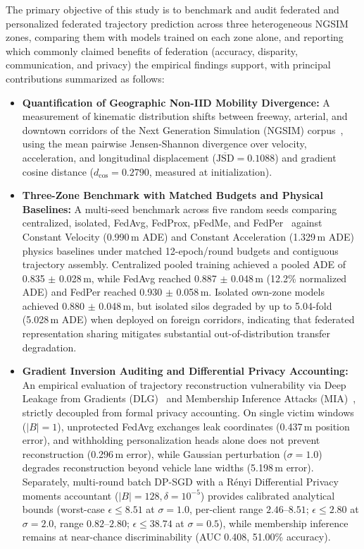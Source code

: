 \documentclass[journal]{IEEEtran}
\begin{document}
The primary objective of this study is to benchmark and audit federated and personalized federated trajectory prediction across three heterogeneous NGSIM zones, comparing them with models trained on each zone alone, and reporting which commonly claimed benefits of federation (accuracy, disparity, communication, and privacy) the empirical findings support, with principal contributions summarized as follows:
\begin{itemize}
    \item \textbf{Quantification of Geographic Non-IID Mobility Divergence:} A measurement of kinematic distribution shifts between freeway, arterial, and downtown corridors of the Next Generation Simulation (NGSIM) corpus~\cite{fhwa2006ngsim}, using the mean pairwise Jensen-Shannon divergence over velocity, acceleration, and longitudinal displacement ($\overline{\mathrm{JSD}} = 0.1088$) and gradient cosine distance ($d_{\cos} = 0.2790$, measured at initialization).
    \item \textbf{Three-Zone Benchmark with Matched Budgets and Physical Baselines:} A multi-seed benchmark across five random seeds comparing centralized, isolated, FedAvg, FedProx, pFedMe, and FedPer~\cite{arivazhagan2019federated} against Constant Velocity (0.990\,m ADE) and Constant Acceleration (1.329\,m ADE) physics baselines under matched 12-epoch/round budgets and contiguous trajectory assembly. Centralized pooled training achieved a pooled ADE of 0.835 $\pm$ 0.028\,m, while FedAvg reached 0.887 $\pm$ 0.048\,m (12.2\% normalized ADE) and FedPer reached 0.930 $\pm$ 0.058\,m. Isolated own-zone models achieved 0.880 $\pm$ 0.048\,m, but isolated silos degraded by up to 5.04-fold (5.028\,m ADE) when deployed on foreign corridors, indicating that federated representation sharing mitigates substantial out-of-distribution transfer degradation.
    \item \textbf{Gradient Inversion Auditing and Differential Privacy Accounting:} An empirical evaluation of trajectory reconstruction vulnerability via Deep Leakage from Gradients (DLG)~\cite{zhu2019deep} and Membership Inference Attacks (MIA)~\cite{shokri2017membership}, strictly decoupled from formal privacy accounting. On single victim windows ($|B|=1$), unprotected FedAvg exchanges leak coordinates (0.437\,m position error), and withholding personalization heads alone does not prevent reconstruction (0.296\,m error), while Gaussian perturbation ($\sigma=1.0$) degrades reconstruction beyond vehicle lane widths (5.198\,m error). Separately, multi-round batch DP-SGD with a R\'enyi Differential Privacy moments accountant ($|B|=128, \delta=10^{-5}$) provides calibrated analytical bounds (worst-case $\epsilon \le 8.51$ at $\sigma=1.0$, per-client range $2.46$--$8.51$; $\epsilon \le 2.80$ at $\sigma=2.0$, range $0.82$--$2.80$; $\epsilon \le 38.74$ at $\sigma=0.5$), while membership inference remains at near-chance discriminability (AUC 0.408, 51.00\% accuracy).
\end{itemize}
\end{document}
